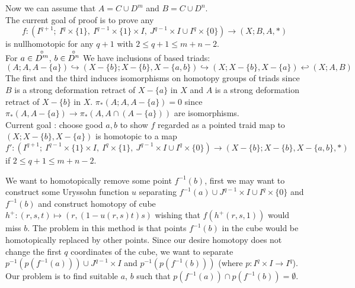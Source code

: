 \begin{prf}
        Now we can assume that $A = C \cup D^m$ and $B = C \cup D^n$.\\

        The current goal of proof is to prove any
        $$
        f : (I^{q+1};\ I^q \times \{1\},\ I^{q-1} \times \{1\} \times I,\  J^{q-1} \times I \cup I^q \times \{0\}) \to (X; B, A, \ast)
        $$
        is nullhomotopic for any $q+1$ with $2 \leq q+1 \leq m+n-2$.\\
        For $a \in \overset{\circ}{D^m}$, $b\in \overset{\circ}{D^n}$ We have inclusions of based triads:
        $$
            (A;A,A-\{a\}) \hookrightarrow (X - \{b\};X -\{b\}, X - \{a,b\})
            \hookrightarrow (X;X-\{b\},X-\{a\}) \hookleftarrow (X;A,B)
        $$
        The first and the third induces
        isomorphisms on homotopy groups of triads
        since $B$ is a strong deformation retract of $X - \{a\}$ in $X$
        and $A$ is a strong deformation retract of $X - \{b\}$ in $X$.
        $\pi_{*}(A;A,A - \{a\}) = 0$ since
        $\pi_*(A,A - \{a\}) \to \pi_*(A,A \cap (A - \{a\}) )$
        are isomorphisms.\\
        
        Current goal : choose good $a,b$ to show $f$ regarded as a pointed traid map to $(X;X-\{b\},X-\{a\})$
        is homotopic to a map
        $$
        f' : (I^{q+1};\ I^{q-1} \times \{1\} \times I,\ I^q \times \{1\},\  J^{q-1} \times I \cup I^q \times \{0\}) \to (X - \{b\}; X-\{b\}, X-\{a,b\}, \ast)
        $$
        if $2 \leq q+1 \leq m+n-2$.\\

        \begin{note}
            We want to homotopically remove some point $f^{-1}(b)$,
        first we may want to construct some Uryssohn function $u$
        separating $f^{-1}(a) \cup J^{q-1} \times I \cup I^q \times \{0\}$ and $f^{-1}(b)$ 
        and construct homotopy of cube $h^+: (r,s,t) \mapsto (r,(1-u(r,s)t)s)$
        wishing that $f(h^+(r,s,1))$ would miss $b$.
        The problem in this method is that
        points $f^{-1}(b)$ in the cube would be homotopically
        replaced by other points.
        Since our desire homotopy does not change the first $q$
        coordinates of the cube, we want to separate
        $p^{-1}(p(f^{-1}(a))) \cup J^{q-1} \times I$
        and
        $p^{-1}(p(f^{-1}(b)))$
        (where $p : I^q \times I \to I^q$).
        Our problem is to find suitable $a$, $b$ such that
        $p(f^{-1}(a)) \cap p(f^{-1}(b)) = \emptyset$.\\
        \end{note}
        

\end{prf}

